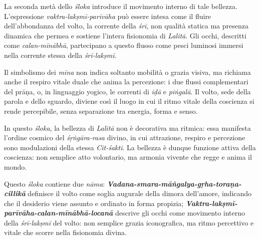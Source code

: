 La seconda metà dello \textit{śloka} introduce il movimento interno di tale bellezza. L’espressione \textit{vaktra-lakṣmī-parīvāha} può essere intesa come il fluire dell’abbondanza del volto, la corrente della \textit{śrī}, non qualità statica ma presenza dinamica che permea e sostiene l’intera fisionomia di \textit{Lalitā}. Gli occhi, descritti come \textit{calan-mīnābhā}, partecipano a questo flusso come pesci luminosi immersi nella corrente stessa della \textit{śrī-lakṣmī}.

Il simbolismo dei \textit{mīna} non indica soltanto mobilità o grazia visiva, ma richiama anche il respiro vitale duale che anima la percezione: i due flussi complementari del prāṇa, o, in linguaggio yogico, le correnti di \textit{iḍā} e \textit{piṅgalā}. Il volto, sede della parola e dello sguardo, diviene così il luogo in cui il ritmo vitale della coscienza si rende percepibile, senza separazione tra energia, forma e senso.

In questo \textit{śloka}, la bellezza di \textit{Lalitā} non è decorativa ma ritmica: essa manifesta l’ordine cosmico del \textit{śṛṅgāra-rasa} divino, in cui attrazione, respiro e percezione sono modulazioni della stessa \textit{Cit-śakti}. La bellezza è dunque funzione attiva della coscienza: non semplice atto volontario, ma armonia vivente che regge e anima il mondo.

Questo \textit{śloka} contiene due \textit{nāma}: \textbf{\textit{Vadana-smara-māṅgalya-gṛha-toraṇa-cillikā}} definisce il volto come soglia augurale della dimora dell’amore, indicando che il desiderio viene assunto e ordinato in forma propizia; \textbf{\textit{Vaktra-lakṣmī-parīvāha-calan-mīnābhā-locanā}} descrive gli occhi come movimento interno della \textit{śrī-lakṣmī} del volto: non semplice grazia iconografica, ma ritmo percettivo e vitale che scorre nella fisionomia divina.
